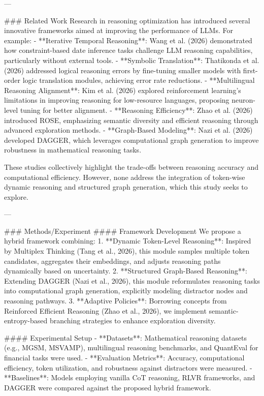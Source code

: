 ---

### Related Work  
Research in reasoning optimization has introduced several innovative frameworks aimed at improving the performance of LLMs. For example:  
- **Iterative Temporal Reasoning**: Wang et al. (2026) demonstrated how constraint-based date inference tasks challenge LLM reasoning capabilities, particularly without external tools.  
- **Symbolic Translation**: Thatikonda et al. (2026) addressed logical reasoning errors by fine-tuning smaller models with first-order logic translation modules, achieving error rate reductions.  
- **Multilingual Reasoning Alignment**: Kim et al. (2026) explored reinforcement learning’s limitations in improving reasoning for low-resource languages, proposing neuron-level tuning for better alignment.  
- **Reasoning Efficiency**: Zhao et al. (2026) introduced ROSE, emphasizing semantic diversity and efficient reasoning through advanced exploration methods.  
- **Graph-Based Modeling**: Nazi et al. (2026) developed DAGGER, which leverages computational graph generation to improve robustness in mathematical reasoning tasks.  

These studies collectively highlight the trade-offs between reasoning accuracy and computational efficiency. However, none address the integration of token-wise dynamic reasoning and structured graph generation, which this study seeks to explore.

---

### Methods/Experiment  
#### Framework Development  
We propose a hybrid framework combining:  
1. **Dynamic Token-Level Reasoning**: Inspired by Multiplex Thinking (Tang et al., 2026), this module samples multiple token candidates, aggregates their embeddings, and adjusts reasoning paths dynamically based on uncertainty.  
2. **Structured Graph-Based Reasoning**: Extending DAGGER (Nazi et al., 2026), this module reformulates reasoning tasks into computational graph generation, explicitly modeling distractor nodes and reasoning pathways.  
3. **Adaptive Policies**: Borrowing concepts from Reinforced Efficient Reasoning (Zhao et al., 2026), we implement semantic-entropy-based branching strategies to enhance exploration diversity.  

#### Experimental Setup  
- **Datasets**: Mathematical reasoning datasets (e.g., MGSM, MSVAMP), multilingual reasoning benchmarks, and QuantEval for financial tasks were used.  
- **Evaluation Metrics**: Accuracy, computational efficiency, token utilization, and robustness against distractors were measured.  
- **Baselines**: Models employing vanilla CoT reasoning, RLVR frameworks, and DAGGER were compared against the proposed hybrid framework.  

